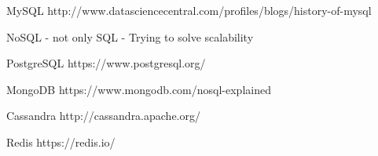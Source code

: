MySQL
http://www.datasciencecentral.com/profiles/blogs/history-of-mysql


NoSQL - not only SQL
- Trying to solve scalability

PostgreSQL
https://www.postgresql.org/

MongoDB
https://www.mongodb.com/nosql-explained

Cassandra
http://cassandra.apache.org/

Redis
https://redis.io/
